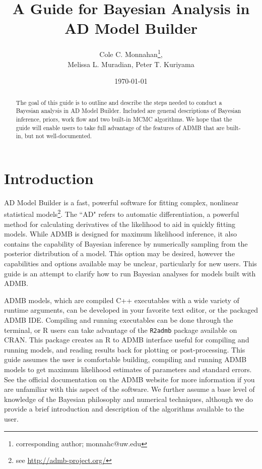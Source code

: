 \documentclass{article}\usepackage[]{graphicx}\usepackage[]{color}
\begin{document}
\title{A Guide for Bayesian Analysis in \\AD Model Builder} \author{Cole
  C. Monnahan\footnote{corresponding author; monnahc@uw.edu},\\ Melissa
  L. Muradian, Peter T. Kuriyama }
\date{\today{}}
\maketitle
\begin{abstract}
  The goal of this guide is to outline and describe the steps needed to
  conduct a Bayesian analysis in AD Model Builder. Included are general
  descriptions of Bayesian inference, priors, work flow and two built-in
  MCMC algorithms. We hope that the guide will enable users to take full
  advantage of the features of ADMB that are built-in, but not
  well-documented.

\end{abstract}

\tableofcontents

\section{Introduction}
AD Model Builder is a fast, powerful software for fitting
complex, nonlinear statistical
models\cite{fournier2012}\footnote{see
  \url{http://admb-project.org/}}.  The ``AD" refers to
automatic differentiation, a powerful method for calculating
derivatives of the likelihood to aid in quickly fitting
models. While ADMB is designed for maximum likelihood
inference, it also contains the capability of Bayesian
inference by numerically sampling from the posterior
distribution of a model. This option may be desired, however
the capabilities and options available may be unclear,
particularly for new users. This guide is an attempt to
clarify how to run Bayesian analyses for models built with
ADMB.

ADMB models, which are compiled C++ executables with a wide
variety of runtime arguments, can be developed in your
favorite text editor, or the packaged ADMB IDE. Compiling
and running executables can be done through the terminal, or
R users can take advantage of the \texttt{R2admb} package
available on CRAN. This package creates an R to ADMB
interface useful for compiling and running models, and
reading results back for plotting or post-processing. This
guide assumes the user is comfortable building, compiling
and running ADMB models to get maximum likelihood estimates
of parameters and standard errors. See the official
documentation on the ADMB website for more information if
you are unfamiliar with this aspect of the software. We
further assume a base level of knowledge of the Bayesian
philosophy and numerical techniques, although we do provide
a brief introduction and description of the algorithms
available to the user.
\end{document}
